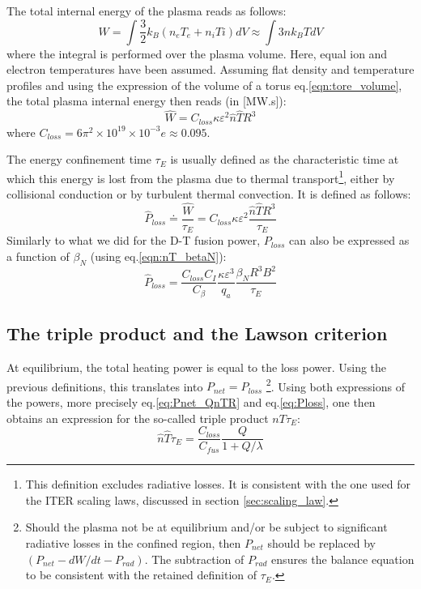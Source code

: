 The total internal energy of the plasma reads as follows:
\begin{equation}
  W  = \int \frac{3}{2} k_B \left( n_e T_e + n_i Ti \right ) dV 
  \approx \int 3 n k_BT dV
\end{equation}
where the integral is performed over the plasma volume. Here, equal ion and electron temperatures have been assumed. Assuming flat density and temperature profiles and using the expression of the volume of a torus eq.\ref{eqn:tore_volume}, the total plasma internal energy then reads (in [MW.s]):
\begin{equation}
  \hat W = C_{loss} \kappa \varepsilon^2  \hat n \hat T R^3
\label{eq:total_energy}
\end{equation}
where $C_{loss} = 6\pi^2 \times 10^{19} \times 10^{-3}e \approx 0.095$.

The energy confinement time $\tau_E$ is usually defined as the characteristic time at which this energy is lost from the plasma due to thermal transport\footnote{This definition excludes radiative losses. It is consistent with the one used for the ITER scaling laws, discussed in section \ref{sec:scaling_law}.}, either by collisional conduction or by turbulent thermal convection. It is defined as follows:
\begin{equation}
\boxed{
  \hat P_{loss} \doteq \frac{\hat W}{\tau_E} 
  = C_{loss} \kappa \varepsilon^2  \frac{\hat n \hat T R^3}{\tau_E}
}
\label{eq:Ploss}
\end{equation}
Similarly to what we did for the D-T fusion power, $P_{loss}$ can also be expressed as a function of $\beta_N$ (using eq.\ref{eqn:nT_betaN}):
\begin{equation}
  \hat P_{loss} = \frac{C_{loss}C_I}{C_\beta}  \frac{\kappa \varepsilon^3}{q_a}
    \frac{\beta_N R^3 B^2}{\tau_E}
\label{eq:Ploss_betaN}
\end{equation}


\subsection{The triple product and the Lawson criterion}
At equilibrium, the total heating power is equal to the loss power. Using the previous definitions, this translates into $P_{net} =P_{loss}$ \footnote{Should the plasma not be at equilibrium and/or be subject to significant radiative losses in the confined region, then $P_{net}$ should be replaced by $(P_{net}-dW/dt-P_{rad})$. The subtraction of $P_{rad}$ ensures the balance equation to be consistent with the retained definition of $\tau_E$.}.
Using both expressions of the powers, more precisely eq.\ref{eq:Pnet_QnTR} and eq.\ref{eq:Ploss}, one then obtains an expression for the so-called triple product $nT\tau_E$:
\begin{equation}
\boxed{
  \hat n \hat T \tau_E = \frac{C_{loss}}{C_{fus}} \frac{Q}{1+Q/\lambda} }
\label{eq:nTtau_Q}
\end{equation}

